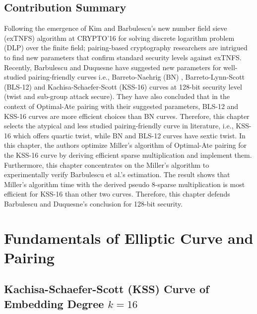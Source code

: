 \subsection{Contribution Summary}
Following the emergence of Kim and Barbulescu's new number field sieve (exTNFS) algorithm at CRYPTO'16 \cite{C:KimBar16} for solving discrete logarithm problem (DLP) over the finite field; pairing-based cryptography researchers are intrigued to find new parameters that confirm standard security levels against exTNFS. 
Recently, Barbulescu and Duquesne have suggested new parameters \cite{EPRINT:BarDuq17} for well-studied pairing-friendly curves i.e., Barreto-Naehrig (BN) \cite{SAC:BarNae05}, Barreto-Lynn-Scott (BLS-12) \cite{SCN:BarLynSco02} and Kachisa-Schaefer-Scott (KSS-16) \cite{EPRINT:KacSchSco07} curves at 128-bit security level (twist and sub-group attack secure). 
They have also concluded that in the context of Optimal-Ate pairing with their suggested parameters, BLS-12 and KSS-16 curves are more efficient choices than BN curves. 
Therefore, this chapter selects the atypical and less studied pairing-friendly curve in literature, i.e., KSS-16 which offers quartic twist, while BN and BLS-12 curves have sextic twist.
In this chapter, the authors optimize Miller's algorithm of Optimal-Ate pairing for the KSS-16 curve by deriving efficient sparse multiplication and implement them.
Furthermore, this chapter concentrates on the Miller's algorithm to experimentally verify Barbulescu et al.'s estimation.
The result shows that Miller's algorithm time with the derived pseudo 8-sparse multiplication is most efficient for KSS-16 than other two curves.
Therefore, this chapter defends Barbulescu and Duquesne's conclusion for 128-bit security.


\section{Fundamentals of Elliptic Curve and Pairing}

\subsection{Kachisa-Schaefer-Scott (KSS) Curve of Embedding Degree \texorpdfstring{$k=16$}{k=16}}
\label{sec:ch:indo:kss16curve}

